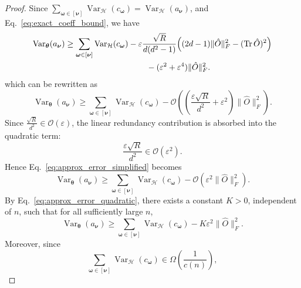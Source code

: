 \documentclass[%
 reprint,
 amsmath,amssymb,
 aps,
 pra,
]{revtex4-2}
\theoremstyle{definition}
\begin{document}
\begin{proof}
Since $\sum_{\bm{\omega}\in[\bm{\nu}]}
\operatorname{Var}_{\mathcal H}(c_{\bm{\omega}})=\operatorname{Var}_{\mathcal H}(a_{\bm{\nu}})$, and Eq.~\eqref{eq:exact_coeff_bound}, we have
\begin{align}
\operatorname{Var}_{\bm{\theta}}(a_{\bm{\nu}})
&\ge
\sum_{\bm{\omega}\in[\bm{\nu}]}
\operatorname{Var}_{\mathcal H}(c_{\bm{\omega}})
-
\varepsilon
\frac{\sqrt{R}}{d(d^2-1)}
\Big(
    (2d-1)\|\hat{O}\|_F^2
    -
    (\operatorname{Tr}\hat{O})^2
\Big) \nonumber\\
&\hspace{3.5cm}
-
(\varepsilon^2+\varepsilon^4)\|\hat{O}\|_F^2 .
\end{align}
which can be rewritten as
\begin{equation}
\label{eq:approx_error_simplified}
\operatorname{Var}_{\bm{\theta}}(a_{\bm{\nu}})
\ge
\sum_{\bm{\omega}\in[\bm{\nu}]}
\operatorname{Var}_{\mathcal H}(c_{\bm{\omega}})
-
\mathcal O\!\left(
    \left(
        \frac{\varepsilon\sqrt R}{d^2}
        +
        \varepsilon^2
    \right)
    \|\hat O\|_F^2
\right).
\end{equation}
Since $\frac{\sqrt R}{d^2} \in \mathcal O(\varepsilon)$, the linear redundancy contribution is absorbed into the quadratic term:
\begin{equation}
    \frac{\varepsilon\sqrt R}{d^2}
    \in
    \mathcal O(\varepsilon^2).
\end{equation}
Hence Eq.~\eqref{eq:approx_error_simplified} becomes
\begin{equation}
\label{eq:approx_error_quadratic}
\operatorname{Var}_{\bm{\theta}}(a_{\bm{\nu}})
\ge
\sum_{\bm{\omega}\in[\bm{\nu}]}
\operatorname{Var}_{\mathcal H}(c_{\bm{\omega}})
-
\mathcal O\!\left(
    \varepsilon^2\|\hat O\|_F^2
\right).
\end{equation}
By Eq.~\eqref{eq:approx_error_quadratic}, there exists a constant \(K>0\),
independent of \(n\), such that for all sufficiently large \(n\),
\begin{equation}
\label{eq:quadratic_error_constant}
\operatorname{Var}_{\bm{\theta}}(a_{\bm{\nu}})
\ge
\sum_{\bm{\omega}\in[\bm{\nu}]}
\operatorname{Var}_{\mathcal H}(c_{\bm{\omega}})
-
K\varepsilon^2\|\hat O\|_F^2 .
\end{equation}
Moreover, since
\begin{equation}
    \sum_{\bm{\omega}\in[\bm{\nu}]}
    \operatorname{Var}_{\mathcal H}(c_{\bm{\omega}})
    \in
    \Omega\!\left(\frac{1}{c(n)}\right),
\end{equation}

\end{proof}
\end{document}
